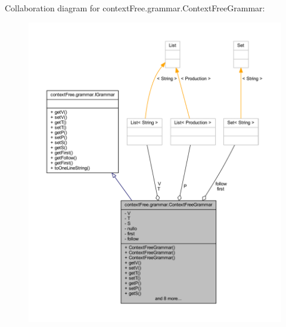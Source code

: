 Collaboration diagram for context\-Free.\-grammar.\-Context\-Free\-Grammar\-:
\nopagebreak
\begin{figure}[H]
\begin{center}
\leavevmode
\includegraphics[width=350pt]{classcontext_free_1_1grammar_1_1_context_free_grammar__coll__graph}
\end{center}
\end{figure}
